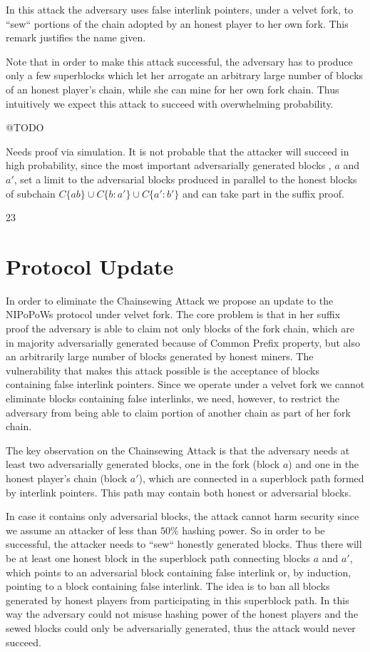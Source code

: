 \documentclass[9pt,a4paper]{article}
\begin{document}
In this attack the adversary uses false interlink pointers, under a velvet fork,  to ``sew`` portions of the chain adopted by an honest player to her own fork. This remark justifies the name given.  

Note that in order to make this attack successful, the adversary has to produce only a few superblocks which let her arrogate an arbitrary large number of blocks of an honest player's chain, while she can mine for her own fork chain. Thus intuitively we expect this attack to succeed with overwhelming probability.

@TODO

Needs proof via simulation. It is not probable that the attacker will succeed in high probability, since the most important adversarially generated blocks , $a$ and $a'$, set a limit to the adversarial blocks produced in parallel to the honest blocks of subchain $C\{ab\} \cup C\{b:a'\} \cup C\{a':b'\}$ and can take part in the suffix proof.

23
\section{Protocol Update}

In order to eliminate the Chainsewing Attack we propose an update to the NIPoPoWs protocol under velvet fork. The core problem is that in her suffix proof the adversary is able to claim not only blocks of the fork chain,  which are in majority adversarially generated because of Common Prefix property, but also an arbitrarily large number of blocks generated by honest miners. The vulnerability that makes this attack possible is the acceptance of blocks containing false interlink pointers. Since we operate under a velvet fork we cannot eliminate blocks containing false interlinks, we need, however, to restrict the adversary from being able to claim portion of another chain as part of her fork chain. 

The key observation on the Chainsewing Attack is that the adversary needs at least two adversarially generated blocks, one in the fork (block $a$) and one in the honest player's chain (block $a'$), which are connected in a superblock path formed by interlink pointers. This path may contain both honest or adversarial blocks. 

In case it contains only adversarial blocks, the attack cannot harm security since we assume an attacker of less than $50\%$ hashing power.
So in order to be successful, the attacker needs to ``sew`` honestly generated blocks. Thus there will be at least one honest block in the superblock path connecting blocks $a$ and $a'$, which points to an adversarial block containing false interlink or, by induction, pointing to a block containing false interlink.
The idea is to ban all blocks generated by honest players from participating in this superblock path. In this way the adversary could not misuse hashing power of the honest players and the sewed blocks could only be adversarially generated, thus the attack would never succeed. 
\end{document}
